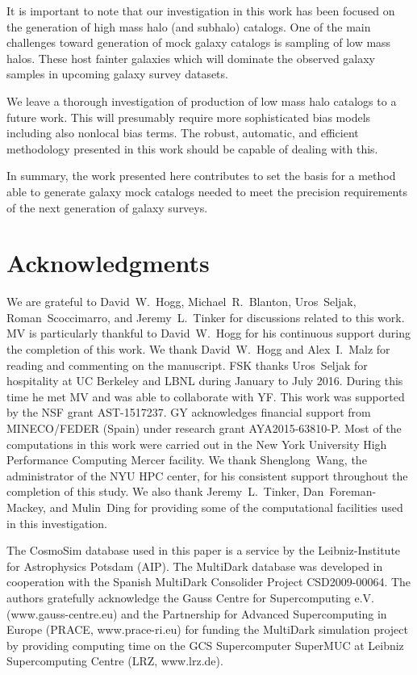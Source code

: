 \documentclass[english,usenatbib]{mn2e}
\begin{document}
It is important to note that our investigation in this work has been focused on the generation of high mass halo (and subhalo) catalogs. One of the main challenges toward generation of mock galaxy catalogs is sampling of low mass halos. These host fainter galaxies which will dominate the observed galaxy samples in upcoming galaxy survey datasets. 

We leave a thorough investigation of production of low mass halo catalogs to a future work. This will presumably require more sophisticated bias models including also nonlocal bias terms. The robust, automatic, and efficient methodology presented in this work should be capable of dealing with this.


In summary, the work presented here contributes to set the basis for a method able to generate galaxy mock catalogs needed to meet the precision requirements of the next generation of galaxy surveys. 


\section*{Acknowledgments}

We are grateful to David~W.~Hogg, Michael~R.~Blanton, Uros~Seljak, Roman~Scoccimarro, and Jeremy~L.~Tinker for discussions related to this work.
MV is particularly thankful to David~W.~Hogg for his continuous support during the completion of this work. We thank David~W.~Hogg and Alex~I.~Malz for reading and commenting on the manuscript.
FSK thanks Uros~Seljak for hospitality at UC Berkeley and LBNL during January to July 2016. During this time he met MV and was able to collaborate with YF.
This work was supported by the NSF grant AST-1517237. GY acknowledges financial support from MINECO/FEDER  (Spain) under research grant AYA2015-63810-P. Most of the computations in this work were carried out in the New York University High Performance Computing Mercer facility. We thank Shenglong~Wang, the administrator of the NYU HPC center, for his consistent support throughout the completion of this study. We also thank Jeremy~L.~Tinker, Dan~Foreman-Mackey, and Mulin~Ding for providing some of the computational facilities used in this investigation.

The CosmoSim database used in this paper is a service by the Leibniz-Institute for Astrophysics Potsdam (AIP). The MultiDark database was developed in cooperation with the Spanish MultiDark Consolider Project CSD2009-00064. The authors gratefully acknowledge the Gauss Centre for Supercomputing e.V. (www.gauss-centre.eu) and the Partnership for Advanced Supercomputing in Europe (PRACE, www.prace-ri.eu) for funding the MultiDark simulation project by providing computing time on the GCS Supercomputer SuperMUC at Leibniz Supercomputing Centre (LRZ, www.lrz.de).


\end{document}
